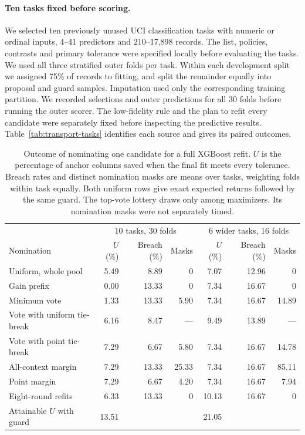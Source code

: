 \paragraph{Ten tasks fixed before scoring.}
We selected ten previously unused UCI classification tasks with numeric or ordinal inputs, 4--41 predictors and 210--17,898 records. The list, policies, contrasts and primary tolerance were specified locally before evaluating the tasks. We used all three stratified outer folds per task. Within each development split we assigned 75\% of records to fitting, and split the remainder equally into proposal and guard samples. Imputation used only the corresponding training partition. We recorded selections and outer predictions for all 30 folds before running the outer scorer. The low-fidelity rule and the plan to refit every candidate were separately fixed before inspecting the predictive results. Table~\ref{tab:transport-tasks} identifies each source and gives its paired outcomes.

\begin{table}[tb]
\centering
\caption{Outcome of nominating one candidate for a full XGBoost refit. $U$ is the percentage of anchor columns saved when the final fit meets every tolerance. Breach rates and distinct nomination masks are means over tasks, weighting folds within task equally. Both uniform rows give exact expected returns followed by the same guard. The top-vote lottery draws only among maximizers. Its nomination masks were not separately timed.}
\label{tab:transport}
\small\setlength{\tabcolsep}{5.0pt}
\begin{tabular}{@{}lrrr@{\quad}rrr@{}}
\toprule
 & \multicolumn{3}{c}{10 tasks, 30 folds} & \multicolumn{3}{c}{6 wider tasks, 16 folds}\\
Nomination & $U$ (\%) & Breach (\%) & Masks & $U$ (\%) & Breach (\%) & Masks\\
\midrule
Uniform, whole pool & 5.49 & 8.89 & 0 & 7.07 & 12.96 & 0\\
Gain prefix & 0.00 & 13.33 & 0 & 7.34 & 16.67 & 0\\
Minimum vote & 1.33 & 13.33 & 5.90 & 7.34 & 16.67 & 14.89\\
Vote with uniform tie-break & 6.16 & 8.47 & --- & 9.49 & 13.89 & ---\\
Vote with point tie-break & 7.29 & 6.67 & 5.80 & 7.34 & 16.67 & 14.78\\
All-context margin & 7.29 & 13.33 & 25.33 & 7.34 & 16.67 & 85.11\\
Point margin & 7.29 & 6.67 & 4.20 & 7.34 & 16.67 & 7.94\\
Eight-round refits & 6.33 & 13.33 & 0 & 10.13 & 16.67 & 0\\
\midrule
Attainable $U$ with guard & 13.51 & & & 21.05 & & \\
\bottomrule
\end{tabular}
\end{table}

